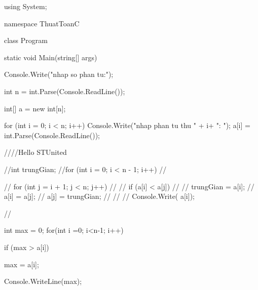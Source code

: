 using System;

namespace ThuatToanC
{
    class Program
    {
        static void Main(string[] args)
        {
            Console.Write("nhap so phan tu:");

            int n = int.Parse(Console.ReadLine());

            int[] a = new int[n];


            for (int i = 0; i < n; i++)
            {
                Console.Write("nhap phan tu thu " + i+ ": ");
                a[i] = int.Parse(Console.ReadLine());
            }

             ////Hello STUnited

            //int trungGian;
            //for (int i = 0; i < n - 1; i++)
            //{
            //    for (int j = i + 1; j < n; j++)
            //    {
            //        if (a[i] < a[j])
            //        {
            //            trungGian = a[i];
            //            a[i] = a[j];
            //            a[j] = trungGian;
            //        }
            //    }
            //    Console.Write( a[i]);

            //}

             int max = 0;
            for(int i =0; i<n-1; i++)
            {
               
                if (max > a[i])
                {
                    max = a[i];
                    
                }
                Console.WriteLine(max);
            }

        }
    }
}
